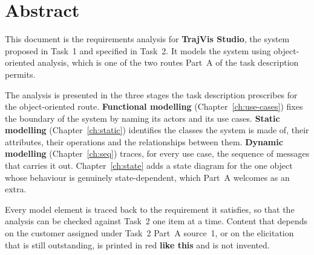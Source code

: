 \documentclass[12pt,a4paper]{report}
\begin{document}
\setcounter{page}{2}

\chapter*{Abstract}

This document is the requirements analysis for \textbf{TrajVis Studio}, the
system proposed in Task~1 and specified in Task~2. It models the system
using object-oriented analysis, which is one of the two routes Part~A of the
task description permits.

The analysis is presented in the three stages the task description
prescribes for the object-oriented route. \textbf{Functional modelling}
(Chapter~\ref{ch:use-cases}) fixes the boundary of the system by naming its
actors and its use cases. \textbf{Static modelling}
(Chapter~\ref{ch:static}) identifies the classes the system is made of,
their attributes, their operations and the relationships between them.
\textbf{Dynamic modelling} (Chapter~\ref{ch:seq}) traces, for every use
case, the sequence of messages that carries it out.
Chapter~\ref{ch:state} adds a state diagram for the one object whose
behaviour is genuinely state-dependent, which Part~A welcomes as an extra.

Every model element is traced back to the requirement it satisfies, so that
the analysis can be checked against Task~2 one item at a time. Content that
depends on the customer assigned under Task~2 Part~A source~1, or on the
elicitation that is still outstanding, is printed in red
{\color{red}\textbf{like this}} and is not invented.
\end{document}
